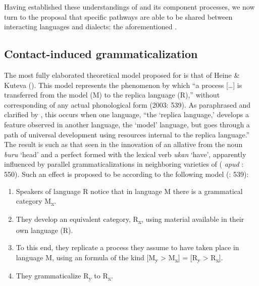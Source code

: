\documentclass[output=paper]{langsci/langscibook}
\begin{document}
Having established these understandings of  and its component processes, we now turn to the proposal that specific  pathways are able to be shared between interacting languages and dialects: the aforementioned .

\subsection{Contact-induced grammaticalization}\label{sec:contgram}


The most fully elaborated theoretical model proposed for  is that of Heine \& Kuteva (\citeyear{HeineKuteva2003,HeineKuteva2005}). This model represents the phenomenon by which “a  process […] is transferred from the model (M) to the replica language (R),” without corresponding  of any actual phonological form (2003: 539). As paraphrased and clarified by \citet[215]{Law2014}, this occurs when one language, “the ‘replica language,’ develops a feature observed in another language, the ‘model’ language, but goes through a path of universal development using resources internal to the replica language.” The result is such as that seen in the  innovation of an allative  from the noun \textit{buru} ‘head’ and a perfect  formed with the lexical verb \textit{ukan} ‘have’, apparently influenced by parallel grammaticalizations in neighboring varieties of  (\citealt{Haase1992} \textit{apud} \citealt{HeineKuteva2003}: 550). Such an effect is proposed to be  according to the following model (\citealt{HeineKuteva2003}: 539):

\begin{enumerate}
\item
Speakers of language R notice that in language M there is a grammatical category M\textsubscript{x}.
\item
They develop an equivalent category, R\textsubscript{x}, using material available in their own language (R).
\item
To this end, they replicate a  process they assume to have taken place in language M, using an  formula of the kind [M\textsubscript{y} > M\textsubscript{x}] = [R\textsubscript{y} > R\textsubscript{x}].
\item
They grammaticalize R\textsubscript{y} to R\textsubscript{x}. 
\end{enumerate} 
\end{document}
